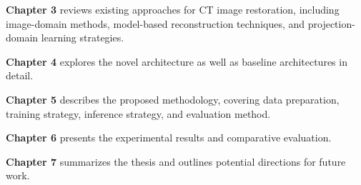 \textbf{Chapter 3} reviews existing approaches for CT image restoration, including image-domain methods, model-based reconstruction techniques, and projection-domain learning strategies. 

\textbf{Chapter 4} explores the novel architecture as well as baseline architectures in detail. 

\textbf{Chapter 5 }describes the proposed methodology, covering data preparation, training strategy, inference strategy, and evaluation method. 

\textbf{Chapter 6} presents the experimental results and comparative evaluation. 

\textbf{Chapter 7} summarizes the thesis and outlines potential directions for future work. 





